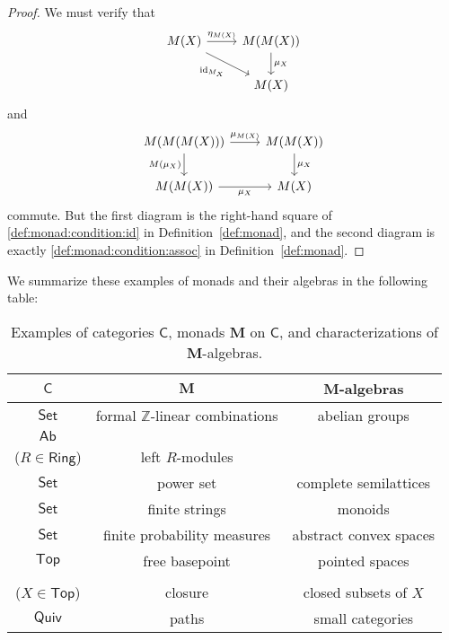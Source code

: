 \documentclass{article}
\theoremstyle{definition}
\newcommand{\C}{\mathsf{C}}
\DeclareMathOperator{\id}{id}
\begin{document}
\begin{proof}
    We must verify that
    \[\begin{tikzcd}[ampersand replacement=\&]
    	M(X) \& {M(M(X))} \\
    	\& M(X)
    	\arrow["{\eta_{M(X)}}", from=1-1, to=1-2]
    	\arrow["\mu_X", from=1-2, to=2-2]
    	\arrow["\id_{M_X}"', from=1-1, to=2-2]
    \end{tikzcd}\]
    and
    \[\begin{tikzcd}[ampersand replacement=\&]
    	{M(M(M(X)))} \& {M(M(X))} \\
    	{M(M(X))} \& M(X)
    	\arrow["{\mu_{M(X)}}", from=1-1, to=1-2]
    	\arrow["\mu_X", from=1-2, to=2-2]
    	\arrow["{M(\mu_X)}"', from=1-1, to=2-1]
    	\arrow["\mu_X"', from=2-1, to=2-2]
    \end{tikzcd}\]
    commute. But the first diagram is the right-hand square of \ref{def:monad:condition:id} in Definition~\ref{def:monad}, and the second diagram is exactly \ref{def:monad:condition:assoc} in Definition~\ref{def:monad}.
\end{proof}

We summarize these examples of monads and their algebras in the following table:

\begin{table}[h]
    \centering
    \def\arraystretch{1.5}
    \begin{tabular}{c|c|c}
         $\C$ & $\mathbf{M}$ & $\mathbf{M}$-algebras \\ \hline
         $\mathsf{Set}$ & formal $\mathbb{Z}$-linear combinations & abelian groups \\
         $\mathsf{Ab}$ & \makecell{$R \otimes {-}$ \\ {\color{gray} ($R \in \mathsf{Ring}$)}}  & left $R$-modules \\
         $\mathsf{Set}$ & power set & complete semilattices \\
         $\mathsf{Set}$ & finite strings & monoids \\
         $\mathsf{Set}$ & finite probability measures & abstract convex spaces \\
         $\mathsf{Top}$ & free basepoint & pointed spaces \\
         \makecell{$\mathcal{P}(X)$ \\ {\color{gray} ($X \in \mathsf{Top}$)}} & closure & closed subsets of $X$ \\
         $\mathsf{Quiv}$ & paths & small categories
    \end{tabular}
    \caption{Examples of categories $\C$, monads $\mathbf{M}$ on $\C$, and characterizations of $\mathbf{M}$-algebras.}
    \label{table:examples:monads-and-algebras}
\end{table}
\end{document}
